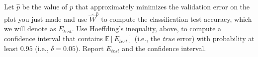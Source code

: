 \documentclass{article}
\newcommand{\1}{\mathbf{1}}
\def\E{\mathbb{E}}
\begin{document}
\begin{enumerate}
Let $\widehat{p}$ be the value of $p$ that approximately minimizes the validation error on the plot you just made and use $\widehat{W}^{\widehat{p}}$ to compute the classification test accuracy, which we will denote as $E_{test}$. 
Use Hoeffding's inequality, above, to compute a confidence interval that contains $\E[E_{test}]$ (i.e., the \emph{true} error) with probability at least $0.95$ (i.e., $\delta=0.05$).
Report $E_{test}$ and the confidence interval. 


\end{enumerate}
\end{document}
